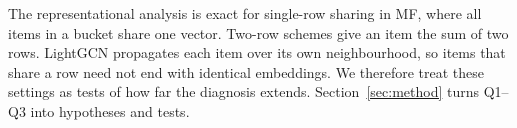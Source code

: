 The representational analysis is exact for single-row sharing in MF, where all items in a bucket share one vector. Two-row schemes give an item the sum of two rows. LightGCN propagates each item over its own neighbourhood, so items that share a row need not end with identical embeddings. We therefore treat these settings as tests of how far the diagnosis extends. Section~\ref{sec:method} turns Q1--Q3 into hypotheses and tests.

